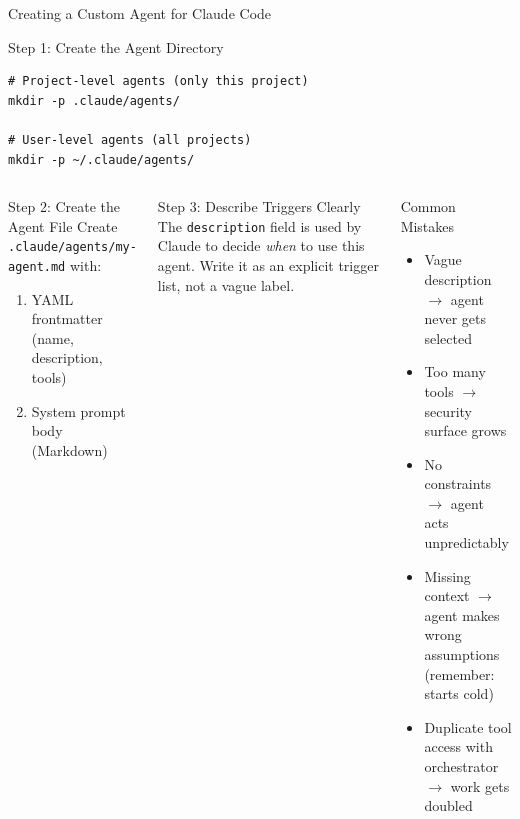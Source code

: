 \documentclass[aspectratio=169,xcolor=dvipsnames]{beamer}
\begin{document}
\begin{frame}[fragile]{Creating a Custom Agent for Claude Code}
    \begin{block}{Step 1: Create the Agent Directory}
                \begin{lstlisting}[style=BashStyle]
# Project-level agents (only this project)
mkdir -p .claude/agents/

# User-level agents (all projects)
mkdir -p ~/.claude/agents/
        \end{lstlisting}
    \end{block}

    \begin{columns}
        \begin{block}{Step 2: Create the Agent File}
            Create \texttt{.claude/agents/my-agent.md} with:
            \begin{enumerate}
                \item YAML frontmatter (name, description, tools)
                \item System prompt body (Markdown)
            \end{enumerate}
        \end{block}
        \begin{block}{Step 3: Describe Triggers Clearly}
            The \texttt{description} field is used by Claude to decide \emph{when} to use this agent. Write it as an explicit trigger list, not a vague label.
        \end{block}

        \begin{alertblock}{Common Mistakes}
            \begin{itemize}
                \item Vague description $\rightarrow$ agent never gets selected
                \item Too many tools $\rightarrow$ security surface grows
                \item No constraints $\rightarrow$ agent acts unpredictably
                \item Missing context $\rightarrow$ agent makes wrong assumptions (remember: starts cold)
                \item Duplicate tool access with orchestrator $\rightarrow$ work gets doubled
            \end{itemize}
        \end{alertblock}
    \end{columns}
\end{frame}
\end{document}
